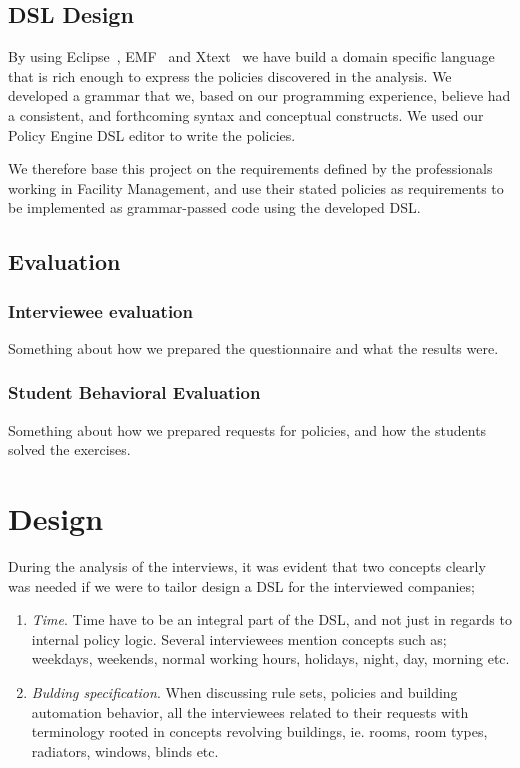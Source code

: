 \documentclass{llncs}
\begin{document}
\subsection{DSL Design}\label{subsec:dsldesign}
By using Eclipse~\cite{eclipse}, EMF~\cite{emf} and Xtext~\cite{xtext} we have build a domain specific language that is rich enough to express the policies discovered in the analysis. We developed a grammar that we, based on our programming experience, believe had a consistent, and forthcoming syntax and conceptual constructs. We used our Policy Engine DSL editor to write the policies.

We therefore base this project on the requirements defined by the professionals working in Facility Management, and use their stated policies as requirements to be implemented as grammar-passed code using the developed DSL.

\subsection{Evaluation}\label{subsec:method-evaluation}

\subsubsection{Interviewee evaluation}\label{subsec:interviewee-evaluation}
Something about how we prepared the questionnaire and what the results were.

\subsubsection{Student Behavioral Evaluation}\label{subsec:student-evaluation}
Something about how we prepared requests for policies, and how the students solved the exercises.

\section{Design}\label{sec:design}
During the analysis of the interviews, it was evident that two concepts clearly was needed if we were to tailor design a DSL for the interviewed companies;
\begin{enumerate}
	\item \textit{Time}. Time have to be an integral part of the DSL, and not just in regards to internal policy logic. Several interviewees mention concepts such as; weekdays, weekends, normal working hours, holidays, night, day, morning etc.
	\item \textit{Bulding specification}. When discussing rule sets, policies and building automation behavior, all the interviewees related to their requests with terminology rooted in concepts revolving buildings, ie. rooms, room types, radiators, windows, blinds etc.
\end{enumerate}
\end{document}
